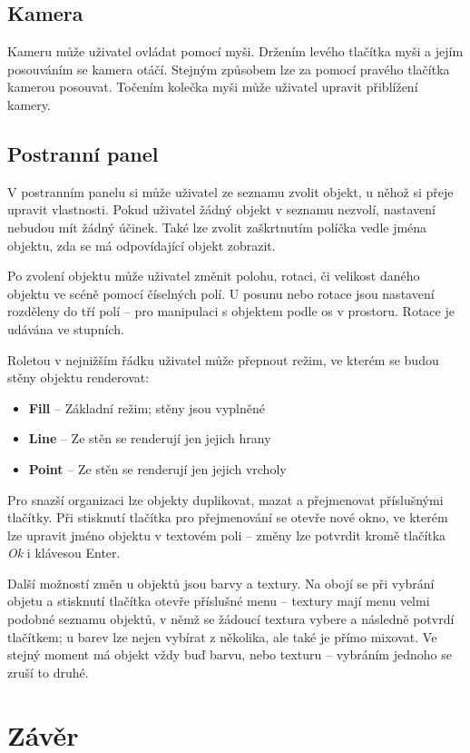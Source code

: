 \documentclass[a4paper, 12pt]{report}
\begin{document}
\section{Kamera}
Kameru může uživatel ovládat pomocí myši. Držením levého tlačítka myši a jejím posouváním se kamera otáčí. Stejným způsobem lze za pomocí pravého tlačítka kamerou posouvat. Točením kolečka myši může uživatel upravit přiblížení kamery.

\section{Postranní panel}
V postranním panelu si může uživatel ze seznamu zvolit objekt, u něhož si přeje upravit vlastnosti. Pokud uživatel žádný objekt v seznamu nezvolí, nastavení nebudou mít žádný účinek. Také lze zvolit zaškrtnutím políčka vedle jména objektu, zda se má odpovídající objekt zobrazit.

Po zvolení objektu může uživatel změnit polohu, rotaci, či velikost daného objektu ve scéně pomocí číselných polí. U posunu nebo rotace jsou nastavení rozděleny do tří polí -- pro manipulaci s objektem podle os v prostoru. Rotace je udávána ve stupních.

\begin{samepage}
Roletou v nejnižším řádku uživatel může přepnout režim, ve kterém se budou stěny objektu renderovat:
\begin{itemize}
    \item \textbf{Fill} -- Základní režim; stěny jsou vyplněné
    \item \textbf{Line} -- Ze stěn se renderují jen jejich hrany
    \item \textbf{Point} -- Ze stěn se renderují jen jejich vrcholy
\end{itemize}
\end{samepage}

Pro snazší organizaci lze objekty duplikovat, mazat a přejmenovat příslušnými tlačítky. Při stisknutí tlačítka pro přejmenování se otevře nové okno, ve kterém lze upravit jméno objektu v textovém poli -- změny lze potvrdit kromě tlačítka \emph{Ok} i klávesou Enter.

Další možností změn u objektů jsou barvy a textury. Na obojí se při vybrání objetu a stisknutí tlačítka otevře příslušné menu -- textury mají menu velmi podobné seznamu objektů, v němž se žádoucí textura vybere a následně potvrdí tlačítkem; u barev lze nejen vybírat z několika, ale také je přímo mixovat. Ve stejný moment má objekt vždy buď barvu, nebo texturu -- vybráním jednoho se zruší to druhé.

\chapter{Závěr}

\begin{flushleft}
    
    
\end{flushleft}

\listoffigures
\end{document}

